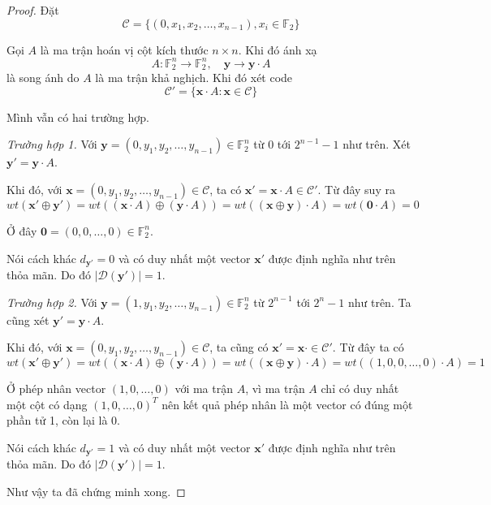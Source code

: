 \begin{proof}  
    Đặt
    \begin{equation*}
        \mathcal{C} = \{ (0, x_1, x_2, \ldots, x_{n-1}), x_i \in \mathbb{F}_2 \}
    \end{equation*}

    Gọi $A$ là ma trận hoán vị cột kích thước $n \times n$. Khi đó ánh xạ
    \begin{equation*}
        A: \mathbb{F}_2^n \to \mathbb{F}_2^n, \quad \bm{y} \to \bm{y} \cdot A
    \end{equation*}
    là song ánh do $A$ là ma trận khả nghịch. Khi đó xét code
    \begin{equation*}\mathcal{C}' = \{ \bm{x} \cdot A: \bm{x} \in \mathcal{C} \}
    \end{equation*}

    Mình vẫn có hai trường hợp.

    \textit{Trường hợp 1.} Với $\bm{y} = (0, y_1, y_2, \ldots, y_{n-1}) \in \mathbb{F}_2^n$ từ $0$ tới $2^{n-1}-1$ như trên. Xét $\bm{y}' = \bm{y} \cdot A$.

    Khi đó, với $\bm{x} = (0, y_1, y_2, \ldots, y_{n-1}) \in \mathcal{C}$, ta có $\bm{x}' = \bm{x} \cdot A \in \mathcal{C}'$. Từ đây suy ra
    \begin{equation*}
        wt(\bm{x}' \oplus \bm{y}') = wt((\bm{x} \cdot A) \oplus (\bm{y} \cdot A)) = wt((\bm{x} \oplus \bm{y}) \cdot A) = wt(\bm{0} \cdot A) = 0
    \end{equation*}

    Ở đây $\bm{0} = (0, 0, \ldots, 0) \in \mathbb{F}_2^n$.

    Nói cách khác $d_{\bm{y}'} = 0$ và có duy nhất một vector $\bm{x}'$ được định nghĩa như trên thỏa mãn. Do đó $\lvert \mathcal{D}(\bm{y}') \rvert = 1$.

    \textit{Trường hợp 2.} Với $\bm{y} = (1, y_1, y_2, \ldots, y_{n-1}) \in \mathbb{F}_2^n$ từ $2^{n-1}$ tới $2^n-1$ như trên. Ta cũng xét $\bm{y}' = \bm{y} \cdot A$.

    Khi đó, với $\bm{x} = (0, y_1, y_2, \ldots, y_{n-1}) \in \mathcal{C}$, ta cũng có $\bm{x}' = \bm{x} \cdot \in \mathcal{C}'$. Từ đây ta có
    \begin{equation*}
        wt(\bm{x}' \oplus \bm{y}') = wt((\bm{x} \cdot A) \oplus (\bm{y} \cdot A)) = wt((\bm{x} \oplus \bm{y}) \cdot A) = wt((1, 0, 0, \ldots, 0) \cdot A) = 1
    \end{equation*}

    Ở phép nhân vector $(1, 0, \ldots, 0)$ với ma trận $A$, vì ma trận $A$ chỉ có duy nhất một cột có dạng $(1, 0, \ldots, 0)^T$ nên kết quả phép nhân là một vector có đúng một phần tử 1, còn lại là 0.

    Nói cách khác $d_{\bm{y}'} = 1$ và có duy nhất một vector $\bm{x}'$ được định nghĩa như trên thỏa mãn. Do đó $\lvert \mathcal{D}(\bm{y}') \rvert = 1$.

    Như vậy ta đã chứng minh xong.
\end{proof}

